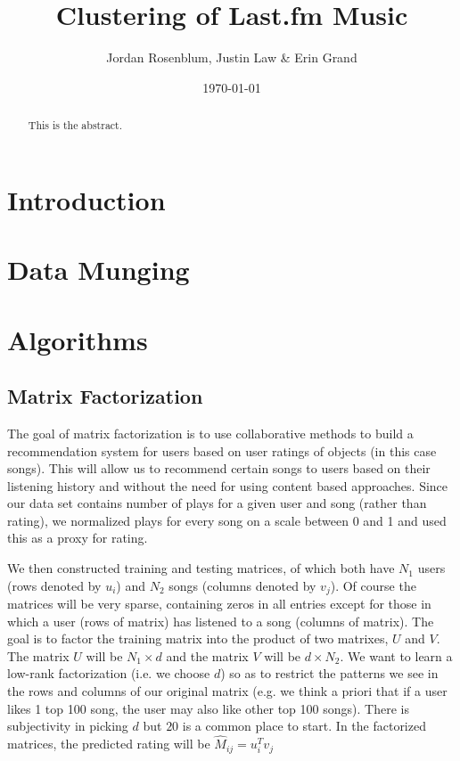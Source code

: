\documentclass[12pt,preprint]{aastex}
\newcommand{\TRANSPOSE}{\ensuremath{T}}
\begin{document}
\title{Clustering of Last.fm Music}

 \author{Jordan Rosenblum, Justin Law \& Erin Grand}
 
\date{\today}             

\begin{abstract}
This is the abstract. 
\end{abstract}

\tableofcontents

\section{Introduction}

\section{Data Munging}


\section{Algorithms}

\subsection{Matrix Factorization}
The goal of matrix factorization is to use collaborative methods to build a recommendation system for users based on user ratings of objects (in this case songs). This will allow us to recommend certain songs to users based on their listening history and without the need for using content based approaches. Since our data set contains number of plays for a given user and song (rather than rating), we normalized plays for every song on a scale between 0 and 1 and used this as a proxy for rating. 


We then constructed training and testing matrices, of which both have $N_1$ users (rows denoted by $u_i$) and $N_2$ songs (columns denoted by $v_j$). Of course the matrices will be very sparse, containing zeros in all entries except for those in which a user (rows of matrix) has listened to a song (columns of matrix). The goal is to factor the training matrix into the product of two matrixes, $U$ and $V$. The matrix $U$ will be $N_1 \times d$ and the matrix $V$ will be $d \times N_2$. We want to learn a low-rank factorization (i.e. we choose $d$) so as to restrict the patterns we see in the rows and columns of our original matrix (e.g. we think a priori that if a user likes 1 top 100 song, the user may also like other top 100 songs). There is subjectivity in picking $d$ but $20$ is a common place to start. In the factorized matrices, the predicted rating will be $\hat{M}_{ij} = u_i^\TRANSPOSE  v_j$ 
\end{document}
